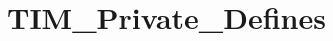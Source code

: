 \hypertarget{group___t_i_m___private___defines}{\section{T\-I\-M\-\_\-\-Private\-\_\-\-Defines}
\label{group___t_i_m___private___defines}
}

